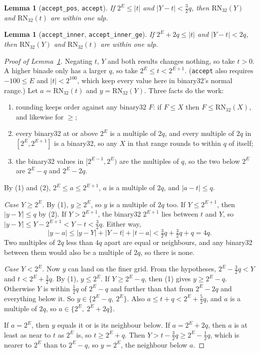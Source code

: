 \documentclass[11pt]{article}
\newtheorem{lemma}[theorem]{Lemma}
\newcommand{\lean}[1]{{\small\texttt{#1}}}
\newcommand{\RN}{\mathrm{RN}}
\begin{document}
\begin{lemma}[\lean{accept\_pos}, \lean{accept}]\label{lem:accept}
If $2^E \le |t|$ and $|Y - t| < \tfrac32 q$, then $\RN_{32}(Y)$ and $\RN_{32}(t)$ are
within one ulp.
\end{lemma}

\begin{lemma}[\lean{accept\_inner}, \lean{accept\_inner\_ge}]\label{lem:inner}
If $2^E + 2q \le |t|$ and $|Y - t| < 2q$, then $\RN_{32}(Y)$ and $\RN_{32}(t)$ are
within one ulp.
\end{lemma}

\begin{proof}[Proof of Lemma~\ref{lem:accept}]
Negating $t$, $Y$ and both results changes nothing, so take $t > 0$. A higher binade only
has a larger $q$, so take $2^E \le t < 2^{E+1}$. (\lean{accept} also requires
$-100 \le E$ and $|t| < 2^{100}$, which keep every value here in binary32's normal
range.) Let $a = \RN_{32}(t)$ and $y = \RN_{32}(Y)$. Three facts do the work:
\begin{enumerate}
\item rounding keeps order against any binary32 $F$: if $F \le X$ then
$F \le \RN_{32}(X)$, and likewise for $\ge$;
\item every binary32 at or above $2^E$ is a multiple of $2q$, and every multiple of $2q$
in $[2^E, 2^{E+1}]$ is a binary32, so any $X$ in that range rounds to within $q$ of itself;
\item the binary32 values in $[2^{E-1}, 2^E)$ are the multiples of $q$, so the two below
$2^E$ are $2^E - q$ and $2^E - 2q$.
\end{enumerate}
By (1) and (2), $2^E \le a \le 2^{E+1}$, $a$ is a multiple of $2q$, and $|a - t| \le q$.

\emph{Case $Y \ge 2^E$.} By (1), $y \ge 2^E$, so $y$ is a multiple of $2q$ too. If
$Y \le 2^{E+1}$, then $|y - Y| \le q$ by (2). If $Y > 2^{E+1}$, the binary32 $2^{E+1}$ lies
between $t$ and $Y$, so $|y - Y| \le Y - 2^{E+1} < Y - t < \tfrac32 q$. Either way,
\[
  |y - a| \le |y - Y| + |Y - t| + |t - a| < \tfrac32 q + \tfrac32 q + q = 4q .
\]
Two multiples of $2q$ less than $4q$ apart are equal or neighbours, and any binary32
between them would also be a multiple of $2q$, so there is none.

\emph{Case $Y < 2^E$.} Now $y$ can land on the finer grid. From the hypotheses,
$2^E - \tfrac32 q < Y$ and $t < 2^E + \tfrac32 q$. By (1), $y \le 2^E$. If
$Y \ge 2^E - q$, then (1) gives $y \ge 2^E - q$. Otherwise $Y$ is within $\tfrac12 q$ of
$2^E - q$ and further than that from $2^E - 2q$ and everything below it. So
$y \in \{2^E - q,\ 2^E\}$. Also $a \le t + q < 2^E + \tfrac52 q$, and $a$ is a multiple of
$2q$, so $a \in \{2^E,\ 2^E + 2q\}$.

If $a = 2^E$, then $y$ equals it or is its neighbour below. If $a = 2^E + 2q$, then $a$ is
at least as near to $t$ as $2^E$ is, so $t \ge 2^E + q$. Then $Y > t - \tfrac32 q \ge
2^E - \tfrac12 q$, which is nearer to $2^E$ than to $2^E - q$, so $y = 2^E$, the neighbour
below $a$.
\end{proof}
\end{document}
